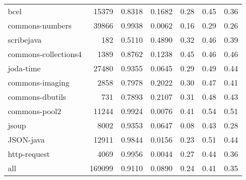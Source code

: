 \begin{table*}
\begin{tabular}{lrrrrrr}
                   bcel &   15379 &          0.8318 &          0.1682 &         0.28 &         0.45 &             0.36 \\
        commons-numbers &   39866 &          0.9938 &          0.0062 &         0.16 &         0.29 &             0.26 \\
             scribejava &     182 &          0.5110 &          0.4890 &         0.32 &         0.46 &             0.39 \\
   commons-collections4 &    1389 &          0.8762 &          0.1238 &         0.45 &         0.46 &             0.46 \\
              joda-time &   27480 &          0.9355 &          0.0645 &         0.29 &         0.49 &             0.44 \\
        commons-imaging &    2858 &          0.7978 &          0.2022 &         0.30 &         0.47 &             0.41 \\
        commons-dbutils &     731 &          0.7893 &          0.2107 &         0.31 &         0.48 &             0.43 \\
          commons-pool2 &   11244 &          0.9924 &          0.0076 &         0.41 &         0.54 &             0.51 \\
                  jsoup &    8002 &          0.9353 &          0.0647 &         0.08 &         0.43 &             0.28 \\
              JSON-java &   12911 &          0.9844 &          0.0156 &         0.23 &         0.51 &             0.44 \\
           http-request &    4069 &          0.9956 &          0.0044 &         0.27 &         0.44 &             0.36 \\
                    all &  169099 &          0.9110 &          0.0890 &         0.24 &         0.41 &             0.35 \\
\bottomrule
\end{tabular}
\end{table*}
